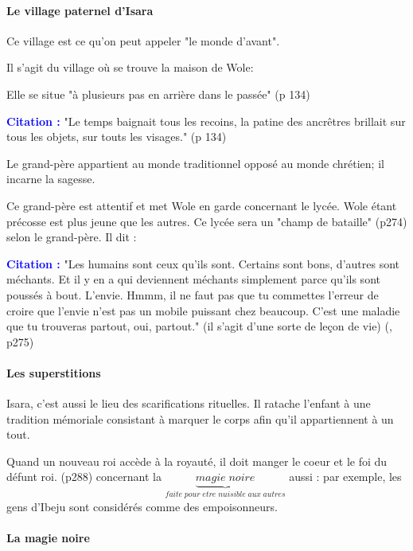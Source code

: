 \documentclass[a4paper, 11pt, hidelinks]{article}
\newcommand{\bs}{\bigskip}
\newcommand{\cit}{\large \textcolor{blue}{\textbf{Citation :}} \large }
\newcommand{\rb}[1]{\Romanbar{#1}}
\begin{document}
\paragraph{Le village paternel d'Isara}

Ce village est ce qu'on peut appeler "le monde d'avant".

\bs

Il s'agit du village où se trouve la maison de Wole:


Elle se situe "à plusieurs pas en arrière dans le passée" (p 134)


\cit "Le temps baignait tous les recoins, la patine des ancrêtres brillait
sur tous les objets, sur touts les visages." (p 134)
\bs


Le grand-père appartient au monde traditionnel opposé au monde chrétien; il incarne la sagesse.

Ce grand-père est attentif et met Wole en garde concernant le lycée. Wole étant précosse est plus jeune que les autres.
Ce lycée sera un "champ de bataille" (p274) selon le grand-père.
Il dit :

\cit "Les humains sont ceux qu'ils sont. Certains sont bons, d'autres sont méchants. Et il y en a qui deviennent méchants
simplement parce qu'ils sont poussés à bout. L'envie. Hmmm, il ne faut pas que tu commettes l'erreur de
croire que l'envie n'est pas un mobile puissant chez beaucoup. C'est une maladie que tu trouveras partout,
oui, partout." (il s'agit d'une sorte de leçon de vie) (\rb{9}, p275)









\paragraph{Les superstitions}

Isara, c'est aussi le lieu des scarifications rituelles. Il ratache l'enfant à une tradition mémoriale consistant
à marquer le corps afin qu'il appartiennent à un tout.

\bs

Quand un nouveau roi accède à la royauté, il doit manger le coeur et le foi du défunt roi. (p288)
concernant la $\underbrace{magie \;noire}_{faite\; pour\; etre\; nuisible\; aux\; autres}$ aussi : par exemple, les gens d'Ibeju sont considérés comme des empoisonneurs.
    



\paragraph{La magie noire}
\end{document}
